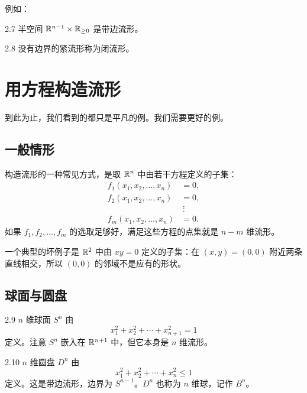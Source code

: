 例如：

\begin{example}{2.7}
半空间 $\mathbb{R}^{n-1}\times\mathbb{R}_{\ge0}$ 是带边流形。
\end{example}

\begin{definition}{2.8}
没有边界的紧流形称为闭流形。
\end{definition}


\section{用方程构造流形}

到此为止，我们看到的都只是平凡的例。我们需要更好的例。

\subsection{一般情形}

构造流形的一种常见方式，是取 $\mathbb{R}^n$ 中由若干方程定义的子集：
\begin{align}
f_1(x_1,x_2,\ldots,x_n) &= 0, \tag{2.5}\\
f_2(x_1,x_2,\ldots,x_n) &= 0, \tag{2.6}\\
&\ \vdots \tag{2.7}\\
f_m(x_1,x_2,\ldots,x_n) &= 0. \tag{2.8}
\end{align}
如果 $f_1,f_2,\ldots,f_m$ 的选取足够好，满足这些方程的点集就是 $n-m$ 维流形。

一个典型的坏例子是 $\mathbb{R}^2$ 中由 $xy=0$ 定义的子集：在 $(x,y)=(0,0)$ 附近两条直线相交，所以 $(0,0)$ 的邻域不是应有的形状。

\subsection{球面与圆盘}

\begin{example}{2.9}
$n$ 维球面 $S^n$ 由
\begin{equation}
x_1^2+x_2^2+\cdots+x_{n+1}^2=1 \tag{2.9}
\end{equation}
定义。注意 $S^n$ 嵌入在 $\mathbb{R}^{n+1}$ 中，但它本身是 $n$ 维流形。
\end{example}

\begin{example}{2.10}
$n$ 维圆盘 $D^n$ 由
\begin{equation}
x_1^2+x_2^2+\cdots+x_n^2\le 1 \tag{2.10}
\end{equation}
定义。这是带边流形，边界为 $S^{n-1}$。$D^n$ 也称为 $n$ 维球，记作 $B^n$。
\end{example}

